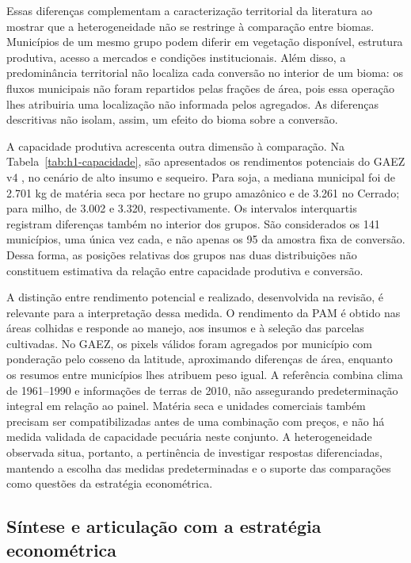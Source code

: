 Essas diferenças complementam a caracterização territorial da literatura ao mostrar que a heterogeneidade não se restringe à comparação entre biomas. Municípios de um mesmo grupo podem diferir em vegetação disponível, estrutura produtiva, acesso a mercados e condições institucionais. Além disso, a predominância territorial não localiza cada conversão no interior de um bioma: os fluxos municipais não foram repartidos pelas frações de área, pois essa operação lhes atribuiria uma localização não informada pelos agregados. As diferenças descritivas não isolam, assim, um efeito do bioma sobre a conversão.

A capacidade produtiva acrescenta outra dimensão à comparação. Na Tabela~\ref{tab:h1-capacidade}, são apresentados os rendimentos potenciais do GAEZ v4 \cite{FAOGAEZ2021}, no cenário de alto insumo e sequeiro. Para soja, a mediana municipal foi de 2.701 kg de matéria seca por hectare no grupo amazônico e de 3.261 no Cerrado; para milho, de 3.002 e 3.320, respectivamente. Os intervalos interquartis registram diferenças também no interior dos grupos. São considerados os 141 municípios, uma única vez cada, e não apenas os 95 da amostra fixa de conversão. Dessa forma, as posições relativas dos grupos nas duas distribuições não constituem estimativa da relação entre capacidade produtiva e conversão.


\FloatBarrier

A distinção entre rendimento potencial e realizado, desenvolvida na revisão, é relevante para a interpretação dessa medida. O rendimento da PAM é obtido nas áreas colhidas e responde ao manejo, aos insumos e à seleção das parcelas cultivadas. No GAEZ, os pixels válidos foram agregados por município com ponderação pelo cosseno da latitude, aproximando diferenças de área, enquanto os resumos entre municípios lhes atribuem peso igual. A referência combina clima de 1961--1990 e informações de terras de 2010, não assegurando predeterminação integral em relação ao painel. Matéria seca e unidades comerciais também precisam ser compatibilizadas antes de uma combinação com preços, e não há medida validada de capacidade pecuária neste conjunto. A heterogeneidade observada situa, portanto, a pertinência de investigar respostas diferenciadas, mantendo a escolha das medidas predeterminadas e o suporte das comparações como questões da estratégia econométrica.

\subsection{Síntese e articulação com a estratégia econométrica}
\label{subsec:mt-sintese}

